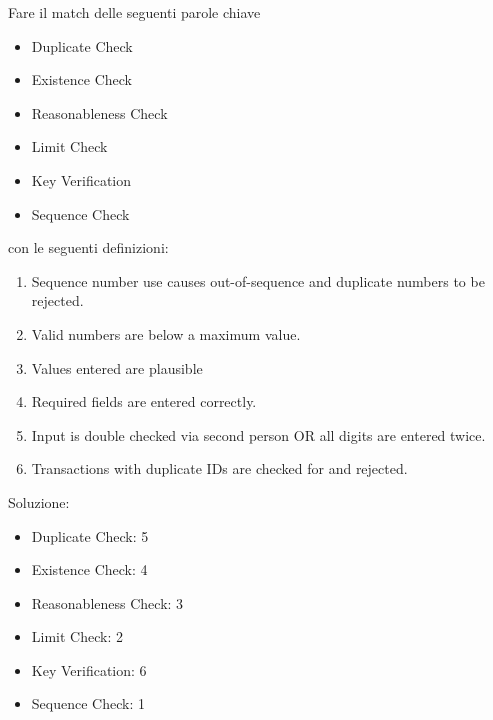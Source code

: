 \begin{Exercise} [
  title={Match definizioni},
  label={esCs7}
  ]

  \Question

  Fare il match delle seguenti parole chiave
  \begin{itemize}
   \item Duplicate Check
   \item Existence Check
   \item Reasonableness Check
   \item Limit Check
   \item Key Verification
   \item Sequence Check
  \end{itemize}

  con le seguenti definizioni:
  \begin{enumerate}
   \item Sequence number use causes out-of-sequence and duplicate 
   numbers to be rejected.
   \item Valid numbers are below a maximum value.
   \item Values entered are plausible
   \item Required fields are entered correctly.
   \item Input is double checked via second person OR all digits are entered
twice.
   \item Transactions with duplicate IDs are checked for and rejected.
  \end{enumerate}

\end{Exercise}

\begin{Answer} [
  ref={esCs7},
  number={7}
  ]

  \Question Soluzione:
  \begin{itemize}
   \item Duplicate Check: 5
   \item Existence Check: 4
   \item Reasonableness Check: 3
   \item Limit Check: 2
   \item Key Verification: 6
   \item Sequence Check: 1
  \end{itemize}


\end{Answer}
